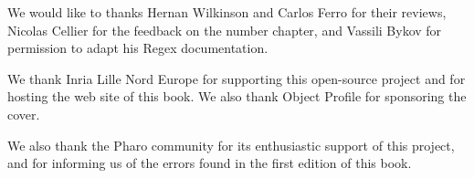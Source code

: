 \documentclass[a4paper,10pt,twoside]{book}
\begin{document}
We would like to thanks Hernan Wilkinson and Carlos Ferro for their reviews, Nicolas Cellier for the feedback on the number chapter, and Vassili Bykov for permission to adapt his Regex documentation.

We thank Inria Lille Nord Europe for supporting this open-source project and for hosting the web site of this book. We also thank Object Profile for sponsoring the cover.

We also thank the Pharo community for its enthusiastic support of this project, and for informing us of the errors found in the first edition of this book.



\ifx\wholebook\relax\else
   
   
\end{document}
